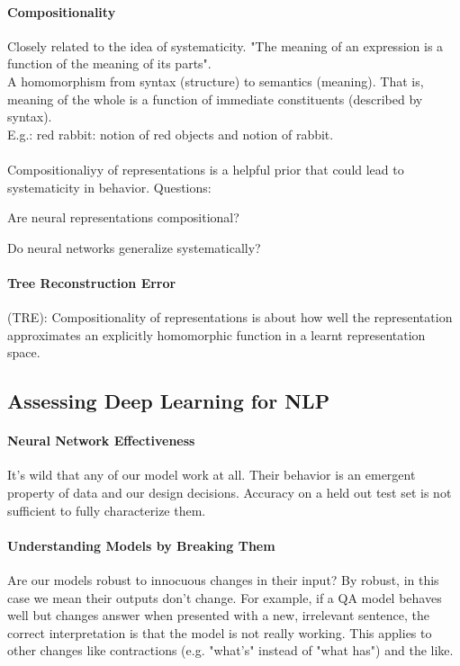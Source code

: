\documentclass[10pt]{report}
\begin{document}
\paragraph{Compositionality} Closely related to the idea of systematicity. "The meaning of an expression is a function of the meaning of its parts".\\
A homomorphism from syntax (structure) to semantics (meaning). That is, meaning of the whole is a function of immediate constituents (described by syntax).\\
E.g.: red rabbit: notion of red objects and notion of rabbit.\\\\
Compositionaliyy of representations is a helpful prior that could lead to systematicity in behavior. Questions:
\begin{list}{}{}
	\item Are neural representations compositional?
	\item Do neural networks generalize systematically?
\end{list}
\paragraph{Tree Reconstruction Error} (TRE): Compositionality of representations is about how well the representation approximates an explicitly homomorphic function in a learnt representation space.
\subsection{Assessing Deep Learning for NLP}
\paragraph{Neural Network Effectiveness} It's wild that any of our model work at all. Their behavior is an emergent property of data and our design decisions. Accuracy on a held out test set is not sufficient to fully characterize them.
\paragraph{Understanding Models by Breaking Them} Are our models robust to innocuous changes in their input? By robust, in this case we mean their outputs don't change. For example, if a QA model behaves well but changes answer when presented with a new, irrelevant sentence, the correct interpretation is that the model is not really working. This applies to other changes like contractions (e.g. "what's" instead of "what has") and the like.
\end{document}

